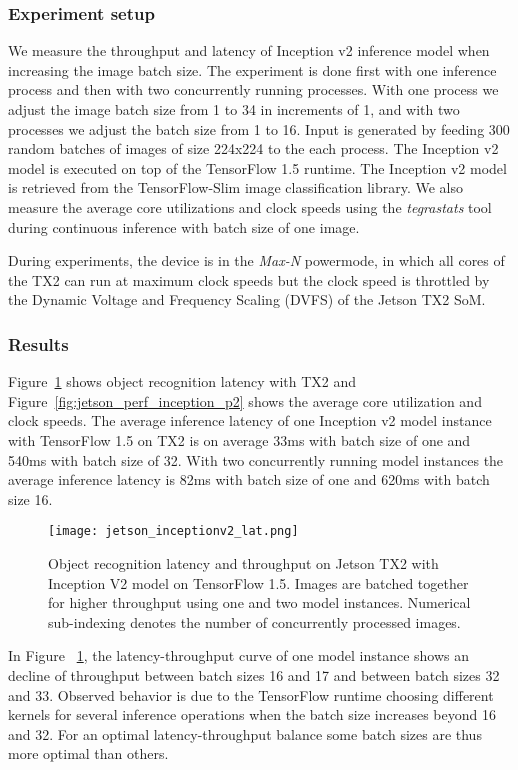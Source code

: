 \documentclass[sigconf]{acmart}
\begin{document}
\subsubsection{Experiment setup}

We measure the throughput and latency of Inception v2 inference model when increasing the image batch size. The experiment is done first with one inference process and then with two concurrently running processes. With one process we adjust the image batch size from 1 to 34 in increments of 1, and with two processes we adjust the batch size from 1 to 16. Input is generated by feeding 300 random batches of images of size 224x224 to the each process. The Inception v2 model is executed on top of the TensorFlow 1.5 runtime. The Inception v2 model is retrieved from the TensorFlow-Slim image classification library.
We also measure the average core utilizations and clock speeds using the \textit{tegrastats} tool during continuous inference with batch size of one image.

During experiments, the device is in the \textit{Max-N} powermode, in which all cores of the TX2 can run at maximum clock speeds but the clock speed is throttled by the Dynamic Voltage and Frequency Scaling (DVFS) of the Jetson TX2 SoM.

\subsubsection{Results}

Figure~\ref{fig:jetson_lat} shows object recognition latency with TX2 and Figure~\ref{fig:jetson_perf_inception_p2} shows the average core utilization and clock speeds. The average inference latency of one Inception v2 model instance with TensorFlow 1.5 on TX2 is on average 33ms with batch size of one and 540ms with batch size of 32. With two concurrently running model instances the average inference latency is 82ms with batch size of one and 620ms with batch size 16.

\begin{figure}[t]
\centering
\texttt{[image: jetson\_inceptionv2\_lat.png]}
\caption{Object recognition latency and throughput on Jetson TX2 with Inception V2 model on TensorFlow 1.5. Images are batched together for higher throughput using one and two model instances. Numerical sub-indexing denotes the number of concurrently processed images.}
\label{fig:jetson_lat}
\end{figure}

In Figure ~\ref{fig:jetson_lat}, the latency-throughput curve of one model instance shows an decline of throughput between batch sizes 16 and 17 and between batch sizes 32 and 33. Observed behavior is due to the TensorFlow runtime choosing different kernels for several inference operations when the batch size increases beyond 16 and 32. For an optimal latency-throughput balance some batch sizes are thus more optimal than others.
\end{document}
